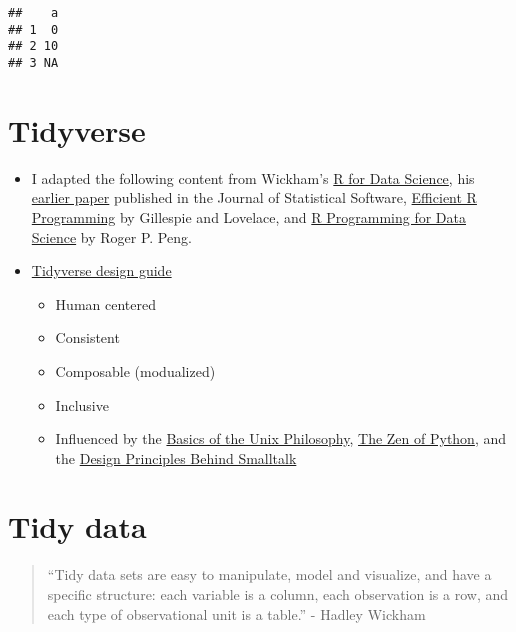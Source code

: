 \documentclass[
]{book}
\begin{document}
\begin{verbatim}
##    a
## 1  0
## 2 10
## 3 NA
\end{verbatim}

\hypertarget{tidyverse}{%
\section{Tidyverse}\label{tidyverse}}

\begin{itemize}
\item
  I adapted the following content from Wickham's \href{https://r4ds.had.co.nz/tidy-data.html}{R for Data Science}, his \href{http://www.jstatsoft.org/v59/i10/paper}{earlier paper} published in the Journal of Statistical Software, \href{https://csgillespie.github.io/efficientR/}{Efficient R Programming} by Gillespie and Lovelace, and \href{https://bookdown.org/rdpeng/rprogdatascience/}{R Programming for Data Science} by Roger P. Peng.
\item
  \href{https://design.tidyverse.org/unifying-principles.html}{Tidyverse design guide}

  \begin{itemize}
  \item
    Human centered
  \item
    Consistent
  \item
    Composable (modualized)
  \item
    Inclusive
  \item
    Influenced by the \href{https://homepage.cs.uri.edu/~thenry/resources/unix_art/ch01s06.html}{Basics of the Unix Philosophy}, \href{https://www.python.org/dev/peps/pep-0020/}{The Zen of Python}, and the \href{https://refs.devinmcgloin.com/smalltalk/Design-Principles-Behind-Smalltalk.pdf}{Design Principles Behind Smalltalk}
  \end{itemize}
\end{itemize}

\hypertarget{tidy-data}{%
\section{Tidy data}\label{tidy-data}}

\begin{quote}
``Tidy data sets are easy to manipulate, model and visualize, and have a specific structure: each variable is a column, each observation is a row, and each type of observational unit is a table.'' - Hadley Wickham
\end{quote}
\end{document}
